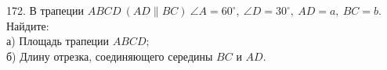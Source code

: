 172. В трапеции $ABCD\ (AD\parallel BC)\ \angle A=60^\circ,\ \angle D=30^\circ,\ AD=a,\ BC=b.$ Найдите:\\
а) Площадь трапеции $ABCD;$\\
б) Длину отрезка, соединяющего середины $BC$ и $AD.$\\
